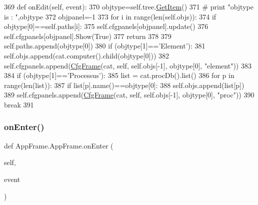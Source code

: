 \begin{DoxyCode}
369     \textcolor{keyword}{def }onEdit(self, event):
370         objtype=self.tree.\hyperlink{namespacetree_a2d9ace69c820aa1a47a130d6f2563dd5}{GetItem}()
371 \textcolor{comment}{#        print "objtype is : ",objtype}
372         objpanel=-1
373         \textcolor{keywordflow}{for} i \textcolor{keywordflow}{in} range(len(self.objs)):
374             \textcolor{keywordflow}{if} objtype[0]==self.paths[i]:
375                 self.cfgpanels[objpanel].update()
376                 self.cfgpanels[objpanel].Show(\textcolor{keyword}{True})
377                 \textcolor{keywordflow}{return}
378             
379         self.paths.append(objtype[0])
380         \textcolor{keywordflow}{if} (objtype[1]==\textcolor{stringliteral}{'Element'}):
381             self.objs.append(cat.computer().child(objtype[0]))
382             self.cfgpanels.append(\hyperlink{namespaceCfgFrame}{CfgFrame}(cat, self, self.objs[-1], objtype[0], \textcolor{stringliteral}{"element"}))
383 
384         \textcolor{keywordflow}{if} (objtype[1]==\textcolor{stringliteral}{'Processus'}):
385             list = cat.procDb().list()
386             \textcolor{keywordflow}{for} p \textcolor{keywordflow}{in} range(len(list)):
387                 \textcolor{keywordflow}{if} list[p].name()==objtype[0]:
388                     self.objs.append(list[p])
389                     self.cfgpanels.append(\hyperlink{namespaceCfgFrame}{CfgFrame}(cat, self, self.objs[-1], objtype[0], \textcolor{stringliteral}{"proc"}))
390                     \textcolor{keywordflow}{break}
391                 
\end{DoxyCode}
\mbox{\label{classAppFrame_1_1AppFrame_a6d45e9371b9574920fbbaff0846cb3a6}} 
\subsubsection{\texorpdfstring{on\+Enter()}{onEnter()}}
{\footnotesize\ttfamily def App\+Frame.\+App\+Frame.\+on\+Enter (\begin{DoxyParamCaption}\item[{}]{self,  }\item[{}]{event }\end{DoxyParamCaption})}



